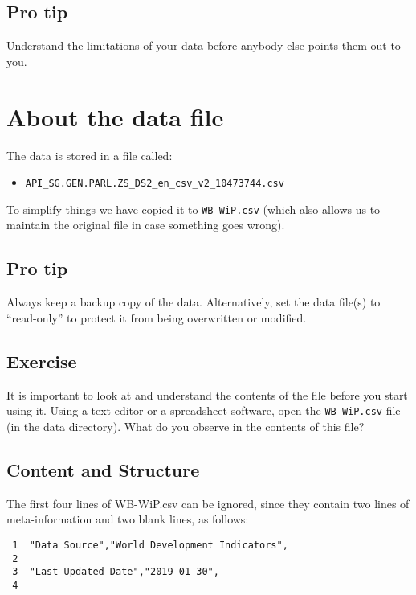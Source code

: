 \documentclass[a4paper,9pt,twocolumn,twoside,printwatermark=false]{pinp}
\providecommand{\tightlist}{%
  \setlength{\itemsep}{0pt}\setlength{\parskip}{0pt}}
\begin{document}
\subsection{Pro tip}\label{pro-tip}

Understand the limitations of your data before anybody else points them
out to you.

\section{About the data file}\label{about-the-data-file}

The data is stored in a file called:

\begin{itemize}
\tightlist
\item
  \texttt{API\_SG.GEN.PARL.ZS\_DS2\_en\_csv\_v2\_10473744.csv}
\end{itemize}

To simplify things we have copied it to \texttt{WB-WiP.csv} (which also
allows us to maintain the original file in case something goes wrong).

\subsection{Pro tip}\label{pro-tip-1}

Always keep a backup copy of the data. Alternatively, set the data
file(s) to ``read-only'' to protect it from being overwritten or
modified.

\subsection{Exercise}\label{exercise}

It is important to look at and understand the contents of the file
before you start using it. Using a text editor or a spreadsheet
software, open the \texttt{WB-WiP.csv} file (in the data directory).
What do you observe in the contents of this file?

\subsection{Content and Structure}\label{content-and-structure}

The first four lines of WB-WiP.csv can be ignored, since they contain
two lines of meta-information and two blank lines, as follows:

\begin{verbatim}
 1  ﻿"Data Source","World Development Indicators",
 2  
 3  "Last Updated Date","2019-01-30",
 4  
\end{verbatim}
\end{document}

